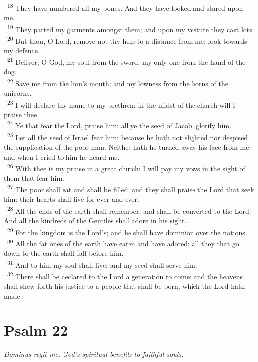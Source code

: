 \documentclass[a5paper,12pt]{article}
\begin{document}
\begin{multicols*}{2}
~\textsuperscript{18} They have numbered all my bones. And they have looked and stared upon me.\\
~\textsuperscript{19} They parted my garments amongst them; and upon my vesture they cast lots.\\
~\textsuperscript{20} But thou, O Lord, remove not thy help to a distance from me; look towards my defence.\\
~\textsuperscript{21} Deliver, O God, my soul from the sword: my only one from the hand of the dog.\\
~\textsuperscript{22} Save me from the lion's mouth; and my lowness from the horns of the unicorns.\\
~\textsuperscript{23} I will declare thy name to my brethren: in the midst of the church will I praise thee.\\
~\textsuperscript{24} Ye that fear the Lord, praise him: all ye the seed of Jacob, glorify him.\\
~\textsuperscript{25} Let all the seed of Israel fear him: because he hath not slighted nor despised the supplication of the poor man. Neither hath he turned away his face from me: and when I cried to him he heard me.\\
~\textsuperscript{26} With thee is my praise in a great church: I will pay my vows in the sight of them that fear him.\\
~\textsuperscript{27} The poor shall eat and shall be filled: and they shall praise the Lord that seek him: their hearts shall live for ever and ever.\\
~\textsuperscript{28} All the ends of the earth shall remember, and shall be converted to the Lord: And all the kindreds of the Gentiles shall adore in his sight.\\
~\textsuperscript{29} For the kingdom is the Lord's; and he shall have dominion over the nations.\\
~\textsuperscript{30} All the fat ones of the earth have eaten and have adored: all they that go down to the earth shall fall before him.\\
~\textsuperscript{31} And to him my soul shall live: and my seed shall serve him.\\
~\textsuperscript{32} There shall be declared to the Lord a generation to come: and the heavens shall shew forth his justice to a people that shall be born, which the Lord hath made.\\

\section{Psalm 22}
\label{sec:org7993b5b}
\emph{Dominus regit me. God's spiritual benefits to faithful souls.}\\


\end{multicols*}
\end{document}
